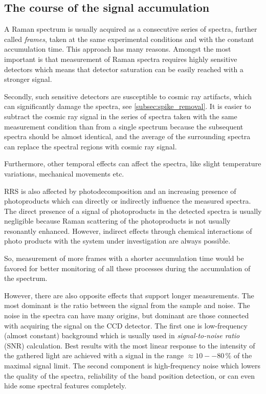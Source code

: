 \subsection{The course of the signal accumulation}

A Raman spectrum is usually acquired as a consecutive series of spectra,
further called \emph{frames}, taken at the same experimental conditions and
with the constant accumulation time.
This approach has many reasons.
Amongst the most important is that measurement of Raman spectra requires highly
sensitive detectors which means that detector saturation can be easily reached
with a stronger signal.

Secondly, such sensitive detectors are susceptible to cosmic ray artifacts,
which can significantly damage the spectra, see
\cref{subsec:spike_removal}.
It is easier to subtract the cosmic ray signal in the series of spectra taken
with the same measurement condition than from a single spectrum because the
subsequent spectra should be almost identical, and the average of the
surrounding spectra can replace the spectral regions with cosmic ray signal.

Furthermore, other temporal effects can affect the spectra, like slight
temperature variations, mechanical movements etc.

RRS is also affected by photodecomposition and an increasing presence of
photoproducts which can directly or indirectly influence the measured spectra.
The direct presence of a signal of photoproducts in the detected spectra is
usually negligible because Raman scattering of the photoproducts is not usually
resonantly enhanced.
However, indirect effects through chemical interactions of photo products with
the system under investigation are always possible.

So, measurement of more frames with a shorter accumulation time would be
favored for better monitoring of all these processes during the accumulation of
the spectrum.

However, there are also opposite effects that support longer measurements.
The most dominant is the ratio between the signal from the sample and noise.
The noise in the spectra can have many origins, but dominant are those
connected with acquiring the signal on the CCD detector.
The first one is low-frequency (almost constant) background which is usually
used in \emph{signal-to-noise ratio} (SNR) calculation.
Best results with the most linear response to the intensity of the gathered
light are achieved with a signal in the range $\approx 10 -- 80\,\%$ of the
maximal signal limit.
The second component is high-frequency noise which lowers the quality of the
spectra, reliability of the band position detection, or can even hide some
spectral features completely.

